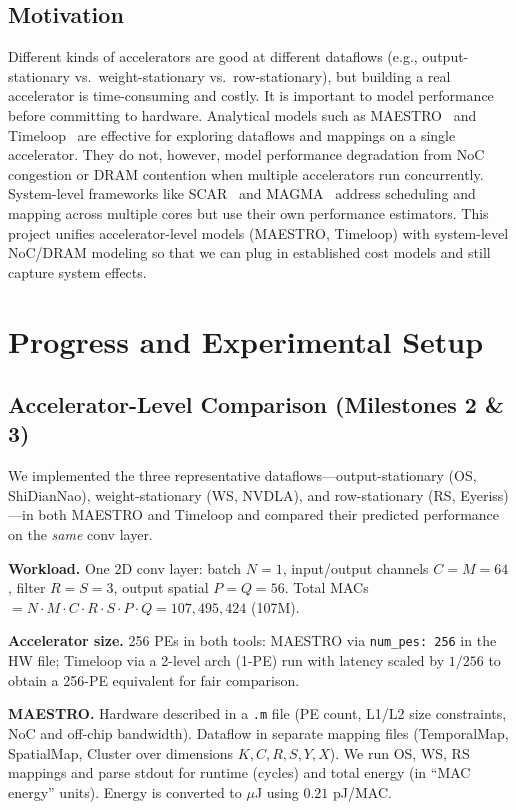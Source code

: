 \documentclass[10pt,sigconf,nonacm]{acmart}
\begin{document}
\subsection{Motivation}
Different kinds of accelerators are good at different dataflows (e.g., output-stationary vs.\ weight-stationary vs.\ row-stationary), but building a real accelerator is time-consuming and costly. It is important to model performance before committing to hardware. Analytical models such as MAESTRO~\cite{maestro2019micro} and Timeloop~\cite{timeloop2019ispass} are effective for exploring dataflows and mappings on a single accelerator. They do not, however, model performance degradation from NoC congestion or DRAM contention when multiple accelerators run concurrently. System-level frameworks like SCAR~\cite{scar2024micro} and MAGMA~\cite{magma2022hpca} address scheduling and mapping across multiple cores but use their own performance estimators. This project unifies accelerator-level models (MAESTRO, Timeloop) with system-level NoC/DRAM modeling so that we can plug in established cost models and still capture system effects.

\section{Progress and Experimental Setup}
\label{sec:progress}

\subsection{Accelerator-Level Comparison (Milestones 2 \& 3)}

We implemented the three representative dataflows---output-stationary (OS, ShiDianNao), weight-stationary (WS, NVDLA), and row-stationary (RS, Eyeriss)---in both MAESTRO and Timeloop and compared their predicted performance on the \emph{same} conv layer.

\textbf{Workload.} One 2D conv layer: batch $N=1$, input/output channels $C=M=64$, filter $R=S=3$, output spatial $P=Q=56$. Total MACs $= N \cdot M \cdot C \cdot R \cdot S \cdot P \cdot Q = 107{,}495{,}424$ (107M).

\textbf{Accelerator size.} 256 PEs in both tools: MAESTRO via \texttt{num\_pes: 256} in the HW file; Timeloop via a 2-level arch (1-PE) run with latency scaled by $1/256$ to obtain a 256-PE equivalent for fair comparison.

\textbf{MAESTRO.} Hardware described in a \texttt{.m} file (PE count, L1/L2 size constraints, NoC and off-chip bandwidth). Dataflow in separate mapping files (TemporalMap, SpatialMap, Cluster over dimensions $K,C,R,S,Y,X$). We run OS, WS, RS mappings and parse stdout for runtime (cycles) and total energy (in ``MAC energy'' units). Energy is converted to $\mu$J using $0.21$ pJ/MAC.
\end{document}
